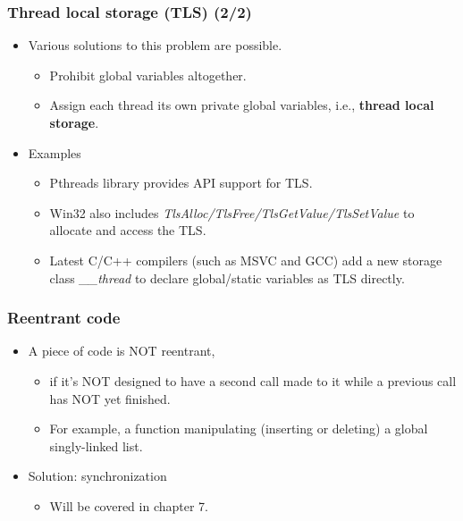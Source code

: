 \documentclass[CJKutf8,xcolor=pdftex,dvipsnames,table]{beamer}
\begin{document}
\begin{CJK*}{UTF8}{song}
  \begin{frame}
  \frametitle{Thread local storage (TLS) (2/2)} \pause
  \begin{itemize}
  \item{Various solutions to this problem are possible.} \pause
    \begin{itemize}
    \item{Prohibit global variables altogether.} \pause
    \item{Assign each thread its own private global variables, i.e., \textbf{thread local storage}.} \pause
    \end{itemize}
  \item{Examples} \pause
    \begin{itemize}
    \item{Pthreads library provides API support for TLS.} \pause
    \item{Win32 also includes \emph{TlsAlloc/TlsFree/TlsGetValue/TlsSetValue} to allocate and access the TLS.} \pause
    \item{Latest C/C++ compilers (such as MSVC and GCC) add a new storage class \emph{\_\_thread} to declare global/static variables as TLS directly.} %
    \end{itemize}
  \end{itemize}
  \end{frame}

  \begin{frame}
  \frametitle{Reentrant code}
  \begin{itemize}
  \item{A piece of code is NOT reentrant,} \pause
    \begin{itemize}
    \item{if it's NOT designed to have a second call made to it while a previous call has NOT yet finished.} \pause
    \item{For example, a function manipulating (inserting or deleting) a global singly-linked list.} \pause
    \end{itemize}
  \item{Solution: synchronization} \pause
    \begin{itemize}
    \item{Will be covered in chapter 7.}
    \end{itemize}
  \end{itemize}
  \end{frame}


\end{CJK*}
\end{document}
